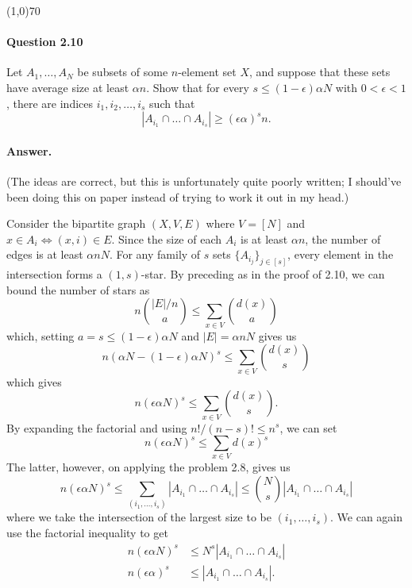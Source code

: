 \begin{center}
	\line(1,0){70}
\end{center}

\paragraph{Question 2.10} Let $A_1,\dots, A_N$ be subsets of some $n$-element set $X$, and suppose that these sets have average size at least $\alpha n$. Show that for every $s\leq (1-\epsilon)\alpha N$ with $0<\epsilon<1$, there are indices $i_1, i_2,\dots, i_s$ such that 
$$|A_{i_1}\cap\dots\cap A_{i_s}|\geq (\epsilon\alpha)^sn.$$

\paragraph{Answer.} (The ideas are correct, but this is unfortunately quite poorly written; I should've been doing this on paper instead of trying to work it out in my head.)

Consider the bipartite graph $(X, V, E)$ where $V = [N]$ and $x\in A_i\iff (x,i)\in E$. Since the size of each $A_i$ is at least $\alpha n$, the number of edges is at least $\alpha nN$. For any family of $s$ sets $\{A_{i_j}\}_{j\in[s]}$, every element in the intersection forms a $(1, s)$-star. By preceding as in the proof of 2.10, we can bound the number of stars as
$$n\binom{|E|/n}{a}\leq \sum_{x\in V}\binom{d(x)}{a}$$
which, setting $a=s\leq (1-\epsilon)\alpha N$ and $|E|=\alpha nN$ gives us
$$n(\alpha N - (1-\epsilon)\alpha N)^s\leq\sum_{x\in V}\binom{d(x)}{s}$$
which gives 
$$n(\epsilon\alpha N)^s\leq \sum_{x\in V}\binom{d(x)}{s}.$$
By expanding the factorial and using $n!/(n-s)!\leq n^s$, we can set
$$n(\epsilon\alpha N)^s\leq \sum_{x\in V} d(x)^s$$
The latter, however, on applying the problem 2.8, gives us
$$n(\epsilon\alpha N)^s\leq\sum_{(i_1,\dots, i_s)}|A_{i_1}\cap\dots\cap A_{i_s}|\leq \binom{N}{s}|A_{i_1}\cap\dots\cap A_{i_s}|$$
where we take the intersection of the largest size to be $(i_1,\dots,i_s)$. We can again use the factorial inequality to get
\begin{align*}
	n(\epsilon\alpha N)^s&\leq N^{s}|A_{i_1}\cap\dots\cap A_{i_s}|\\
	n(\epsilon\alpha)^s&\leq |A_{i_1}\cap\dots\cap A_{i_s}|.
\end{align*}